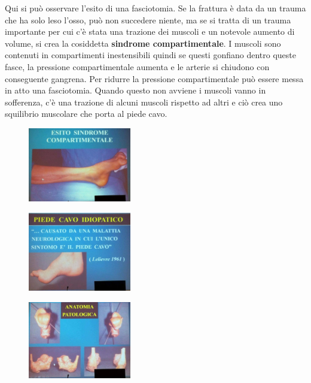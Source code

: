 Qui si può osservare l'esito di una fasciotomia. Se la frattura è data da un trauma che ha solo leso l'osso, può non succedere niente, ma se si tratta di un trauma importante per cui c'è stata una trazione dei muscoli e un notevole aumento di volume, si crea la cosiddetta \textbf{sindrome compartimentale}. I muscoli sono contenuti in compartimenti inestensibili quindi se questi gonfiano dentro queste fasce, la pressione compartimentale aumenta e le arterie si chiudono con conseguente gangrena. Per ridurre la pressione compartimentale può essere messa in atto una fasciotomia. Quando questo non avviene i muscoli vanno in sofferenza, c'è una trazione di alcuni muscoli rispetto ad altri e ciò crea uno squilibrio muscolare che porta al piede cavo.

\begin{figure}[!ht]
\centering
\includegraphics[width=0.4\textwidth]{017/image2.jpg}
\end{figure}

\begin{figure}[!ht]
\centering
\includegraphics[width=0.4\textwidth]{017/image3.jpg}
\end{figure}

\begin{figure}[!ht]
\centering
\includegraphics[width=0.4\textwidth]{017/image4.jpg}
\end{figure}

